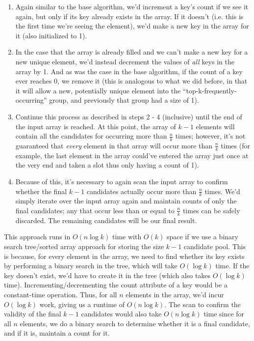 \documentclass[12pt]{article}
\begin{document}
\begin{enumerate}
\begin{enumerate}
        \item Again similar to the base algorithm, we'd increment a key's count if we see it again, but 
        only if its key already exists in the array. If it doesn't (i.e. this is the first time we're 
        seeing the element), we'd make a new key in the array for it (also initialized to 1).
        
        \item In the case that the array is already filled and we can't make a new key for a new unique 
        element, we'd instead decrement the values of \textit{all} keys in the array by 1. And 
        as was the case in the base algorithm, if the count of a key ever reaches 0, we remove it (this is 
        analogous to what we did before, in that it will allow a new, potentially unique element into the 
        ``top-k-frequently-occurring'' group, and previously that group had a size of 1).

        \item Continue this process as described in steps 2 - 4 (inclusive) until the end of the 
        input array is reached. At this point, the array of $k - 1$ elements will contain all 
        the candidates for occurring more than $\frac{n}{k}$ times; however, it's not guaranteed 
        that \textit{every} element in that array will occur more than $\frac{n}{k}$ times (for example, 
        the last element in the array could've entered the array just once at the very end and 
        taken a slot thus only having a count of 1).

        \item Because of this, it's necessary to again scan the input array to confirm whether the final 
        $k - 1$ candidates actually occur more than $\frac{n}{k}$ times. We'd simply iterate over the input array 
        again and maintain counts of only the final candidates; any that occur less than or equal to $\frac{n}{k}$ 
        times can be safely discarded. The remaining candidates will be our final result.
    \end{enumerate}

    This approach runs in $O(n\log k)$ time with $O(k)$ space if we use a binary search tree/sorted array approach 
    for storing the size $k - 1$ candidate pool. This is because, for every element in the array, we need to 
    find whether its key exists by performing a binary search in the tree, which will take $O(\log k)$ time. If the 
    key doesn't exist, we'd have to create it in the tree (which also takes $O(\log k)$ time). Incrementing/decrementing 
    the count attribute of a key would be a constant-time operation. Thus, for all $n$ elements in the array, 
    we'd incur $O(\log k)$ work, giving us a runtime of $O(n\log k)$. The scan to confirm the validity of the final 
    $k - 1$ candidates would also take $O(n\log k)$ time since for all $n$ elements, we do a binary search to 
    determine whether it is a final candidate, and if it is, maintain a count for it.


\end{enumerate}
\end{document}
